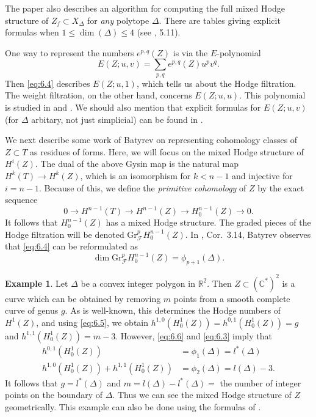 \documentclass{amsart}
\theoremstyle{plain}
\theoremstyle{definition}
\newtheorem*{example}{Example}
\begin{document}
	The paper \cite{DK} also describes an algorithm for computing
the full mixed Hodge structure of $Z_f \subset X_\Delta$ for {\it
any\/} polytope $\Delta$.  There are tables giving explicit formulas
when $1 \le \dim(\Delta) \le 4$ (see \cite{DK}, 5.11).

	One way to represent the numbers $e^{p,q}(Z)$ is via the
$E$-polynomial
\[
E(Z;u,v) = \sum_{p,q} e^{p,q}(Z) u^p v^q.
\]
Then \eqref{eq:6.4} describes $E(Z;u,1)$, which tells us about the Hodge
filtration.  The weight filtration, on the other hand, concerns
$E(Z;u,u)$.  This polynomial is studied in \cite{BB2} and \cite{DL}.
We should also mention that explicit formulas for $E(Z;u,v)$ (for
$\Delta$ arbitary, not just simplicial) can be found in \cite{BB2}.

	We next describe some work of Batyrev \cite{Bat4} on
representing cohomology classes of $Z \subset T$ as residues of forms.
Here, we will focus on the mixed Hodge structure of $H^i(Z)$.  The
dual of the above Gysin map is the natural map $H^k(T) \to H^k(Z)$,
which is an isomorphism for $k < n-1$ and injective for $i = n-1$.
Because of this, we define the {\it primitive cohomology\/} of $Z$ by
the exact sequence
\begin{equation}
0 \longrightarrow H^{n-1}(T) \longrightarrow H^{n-1}(Z)
\longrightarrow H_0^{n-1}(Z) \longrightarrow 0.
\tag{6.5}\label{eq:6.5}
\end{equation}
It follows that $H_0^{n-1}(Z)$ has a mixed Hodge structure.  The
graded pieces of the Hodge filtration will be denoted
$\mathrm{Gr}_{\mathcal{F}}^pH_0^{n-1}(Z)$.  In \cite{Bat4}, Cor.~3.14,
Batyrev observes that \eqref{eq:6.4} can be reformulated as
\begin{equation}
\dim \mathrm{Gr}_{\mathcal{F}}^pH_0^{n-1}(Z) = \phi_{p+1}(\Delta).
\tag{6.6}\label{eq:6.6}
\end{equation}

\begin{example} Let $\Delta$ be a convex integer polygon in
$\mathbb{R}^2$.  Then $Z \subset (\mathbb{C}^*)^2$ is a curve which can be
obtained by removing $m$ points from a smooth complete curve of genus
$g$.  As is well-known, this determines the Hodge numbers of $H^1(Z)$,
and using \eqref{eq:6.5}, we obtain $h^{1,0}(H_0^1(Z)) =
h^{0,1}(H_0^1(Z)) = g$ and $h^{1,1}(H_0^1(Z)) = m - 3$.  However,
\eqref{eq:6.6} and \eqref{eq:6.3} imply that
\begin{align*}
h^{0,1}(H_0^1(Z)) &= \phi_1(\Delta) = l^*(\Delta)\\
h^{1,0}(H_0^1(Z)) + h^{1,1}(H_0^1(Z)) &= 
	\phi_2(\Delta) = l(\Delta) - 3.
\end{align*}
It follows that $g = l^*(\Delta)$ and $m = l(\Delta) - l^*(\Delta) =$
the number of integer points on the boundary of $\Delta$.  Thus we can
see the mixed Hodge structure of $Z$ geometrically.  This example can
also be done using the formulas of \cite{DK}. 
\end{example}
\end{document}
